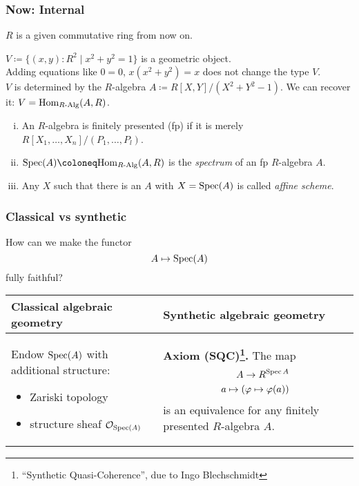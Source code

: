 \documentclass{beamer}
\begin{document}
\begin{frame}
  \frametitle{Now: Internal}
  $R$ is a given commutative ring from now on. \\
  \vspace{0.4cm}
  \pause

  $V\coloneq \{(x,y):R^2\mid x^2+y^2=1 \}$ is a geometric object. \\

  \pause
  Adding equations like $0=0$, $x(x^2+y^2)=x$ does not change the type $V$. \\
  \pause
  $V$ is determined by the $R$-algebra $A\coloneq R[X,Y]/(X^2+Y^2-1)$.
  We can recover it: $V=\mathrm{Hom}_{R\text{-}\mathrm{Alg}}(A,R)$. \\
  \vspace{0.4cm}
  \pause
  \begin{definition}
    \begin{enumerate}[(i)]
    \item An $R$-algebra is finitely presented (fp) if it is merely $R[X_1,\dots,X_n]/(P_1,\dots,P_l)$.
    \item $\Spec(A)\coloneq \Hom_{\Alg{R}}(A,R)$ is the \emph{spectrum} of an fp $R$-algebra $A$.
    \item Any $X$ such that there is an $A$ with $X=\operatorname{Spec}(A)$ is called \emph{affine scheme}.
    \end{enumerate}
  \end{definition}
  
  
   
\end{frame}

\begin{frame}
  \frametitle{Classical vs synthetic}

  How can we make the functor
  \[ A \mapsto \operatorname{Spec}(A) \]
  fully faithful?
  \vspace{5mm}

  \begin{tabularx}{\textwidth}{X|X}
    Classical algebraic geometry
    &
    Synthetic algebraic geometry
    \\ \midrule
    Endow $\operatorname{Spec}(A)$ with additional structure:
    \begin{itemize}
      \item
        Zariski topology
      \item
        structure sheaf $\mathcal{O}_{\operatorname{Spec}(A)}$
    \end{itemize}
    &
    \textbf{Axiom (SQC)\footnote{%
    \enquote{Synthetic Quasi-Coherence}, due to Ingo Blechschmidt}.}
    The map
    \begin{align*}
      A \to R^{\operatorname{Spec} A} \\
      a\mapsto (\varphi\mapsto \varphi(a))
    \end{align*}
    is an equivalence
    for any finitely presented $R$-algebra $A$.
  \end{tabularx}
\end{frame}
 
\end{document}

